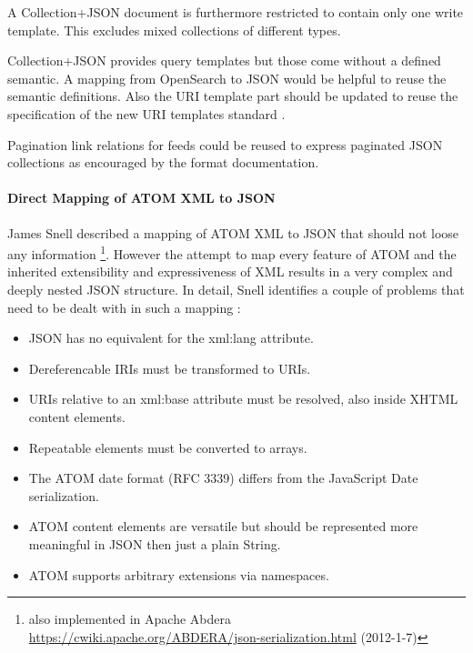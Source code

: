 \documentclass[11pt,a4paper,headsepline,twoside]{scrartcl}		%
\newcommand{\citeurl}[2]{\url{#1} (#2)}
\begin{document}
A Collection+JSON document is furthermore restricted to contain only one write
template. This excludes mixed collections of different types.

Collection+JSON provides query templates but those come without a defined
semantic. A mapping from OpenSearch to JSON would be helpful to reuse the
semantic definitions. Also the URI template part should be updated to reuse the
specification of the new URI templates standard \cite{RFC6570}.

Pagination link relations for feeds \cite{RFC5005} could be reused to express
paginated JSON collections as encouraged by the format
documentation\cite[sec. 5.5]{Amundsen2011a}.


\paragraph{Direct Mapping of ATOM XML to JSON}

James Snell described a mapping of ATOM XML to JSON that should not loose any
information \cite{Snell2008}\footnote{also implemented in Apache Abdera
  \citeurl{https://cwiki.apache.org/ABDERA/json-serialization.html}{2012-1-7}}. However
the attempt to map every feature of ATOM and the inherited extensibility and
expressiveness of XML results in a very complex and deeply nested JSON
structure. In detail, Snell identifies a couple of problems that need to be
dealt with in such a mapping \cite{Snell2008}:

\begin{itemize}
  \item JSON has no equivalent for the xml:lang attribute.
  \item Dereferencable IRIs must be transformed to URIs.
  \item URIs relative to an xml:base attribute must be resolved, also inside XHTML content elements.
  \item Repeatable elements must be converted to arrays.
  \item The ATOM date format (RFC 3339) differs from the JavaScript Date serialization.
  \item ATOM content elements are versatile but should be represented more meaningful in JSON then just a plain String.
  \item ATOM supports arbitrary extensions via namespaces.
\end{itemize}
\end{document}
